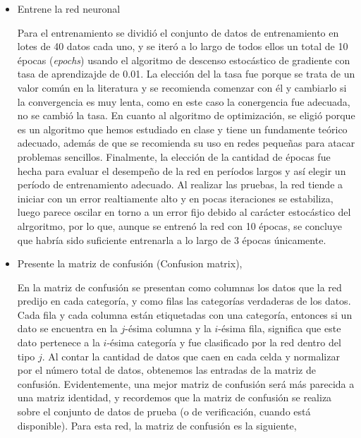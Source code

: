\documentclass{article}
\begin{document}
\begin{enumerate}
\begin{itemize}
        \item Entrene la red neuronal
        
        Para el entrenamiento se dividió el conjunto de datos de entrenamiento en lotes
        de 40 datos cada uno, y se iteró a lo largo de todos ellos un total de 10 épocas
        (\textit{epochs}) usando el algoritmo de descenso estocástico de gradiente con tasa
        de aprendizajde de 0.01. La elección del la tasa fue porque se trata de un valor común
        en la literatura y se recomienda comenzar con él y cambiarlo si la convergencia es muy
        lenta, como en este caso la conergencia fue adecuada, no se cambió la tasa. En cuanto
        al algoritmo de optimización, se eligió porque es un algoritmo que hemos estudiado en
        clase y tiene un fundamente teórico adecuado, además de que se recomienda su uso 
        en redes pequeñas para atacar problemas sencillos. Finalmente, la elección de la
        cantidad de épocas fue hecha para evaluar el desempeño de la red en períodos largos
        y así elegir un período de entrenamiento adecuado. Al realizar las pruebas,
        la red tiende a iniciar con un error realtiamente alto y en pocas iteraciones
        se estabiliza, luego parece oscilar en torno a un error fijo debido al carácter 
        estocástico del alrgoritmo, por lo que, aunque se entrenó la red con 10 épocas,
        se concluye que habría sido suficiente entrenarla a lo largo de 3 épocas únicamente.



        \item Presente la matriz de confusión (Confusion matrix),
        
        En la matriz de confusión se presentan como columnas los datos que la red
        predijo en cada categoría, y como filas las categorías verdaderas de los datos.
        Cada fila y cada columna están etiquetadas con una categoría, entonces si un dato
        se encuentra en la $j$-ésima columna y la $i$-ésima fila, significa que este dato
        pertenece a la $i$-ésima categoría y fue clasificado por la red dentro del tipo
        $j$. Al contar la cantidad de datos que caen en cada celda y normalizar por el
        número total de datos, obtenemos las entradas de la matriz de confusión. Evidentemente,
        una mejor matriz de confusión será más parecida a una matriz identidad, y recordemos
        que la matriz de confusión se realiza sobre el conjunto de datos de prueba (o de
        verificación, cuando está disponible). Para esta red, la matriz de confusión es 
        la siguiente,


\end{itemize}
\end{enumerate}
\end{document}

